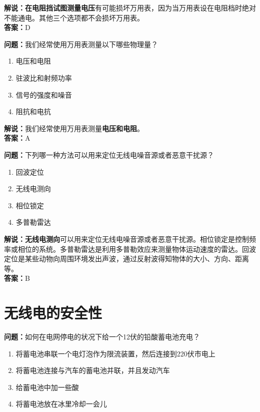 \documentclass{ctexbook}
\begin{document}
\noindent\textbf{解说：在电阻挡试图测量电压}有可能损坏万用表，因为当万用表设在电阻档时绝对不能通电。其他三个选项都不会损坏万用表。\\\noindent\textbf{答案：}D


\bigskip


\noindent\textbf{问题：}我们经常使用万用表测量以下哪些物理量？

\begin{enumerate}[label=\Alph*), leftmargin=3em]
	\item 电压和电阻
	\item 驻波比和射频功率
	\item 信号的强度和噪音
	\item 阻抗和电抗
\end{enumerate}

\noindent\textbf{解说：}我们经常使用万用表测量\textbf{电压和电阻}。\\\noindent\textbf{答案：}A

\bigskip


\noindent\textbf{问题：}下列哪一种方法可以用来定位无线电噪音源或者恶意干扰源？

\begin{enumerate}[label=\Alph*), leftmargin=3em]
	\item 回波定位
	\item 无线电测向
	\item 相位锁定
	\item 多普勒雷达
\end{enumerate}

\noindent\textbf{解说：}\textbf{无线电测向}可以用来定位无线电噪音源或者恶意干扰源。相位锁定是控制频率或相位的系统。多普勒雷达是利用多普勒效应来测量物体运动速度的雷达。回波定位是某些动物向周围环境发出声波，通过反射波得知物体的大小、方向、距离等。\\\noindent\textbf{答案：}B%








\chapter{无线电的安全性}



\noindent\textbf{问题：}如何在电网停电的状况下给一个12伏的铅酸蓄电池充电？

\begin{enumerate}[label=\Alph*), leftmargin=3em]	
	\item 将蓄电池串联一个电灯泡作为限流装置，然后连接到220伏市电上
	\item 将蓄电池连接与汽车的蓄电池并联，并且发动汽车
	\item 给蓄电池中加一些酸
	\item 将蓄电池放在冰里冷却一会儿
\end{enumerate}
\end{document}
